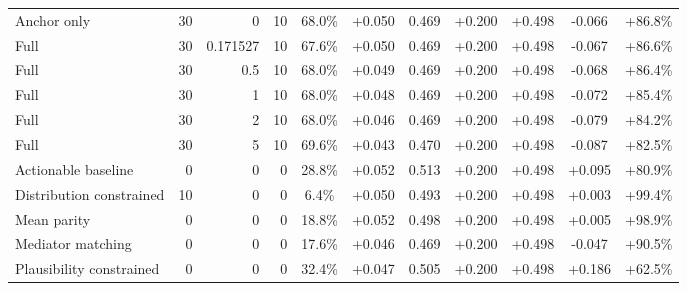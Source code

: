 \begin{table}[htbp]
\begin{tabular}{lrrrccccccc}
Anchor only & 30 & 0 & 10 & 68.0\% & +0.050 & 0.469 & +0.200 & +0.498 & -0.066 & +86.8\% \\
Full & 30 & 0.171527 & 10 & 67.6\% & +0.050 & 0.469 & +0.200 & +0.498 & -0.067 & +86.6\% \\
Full & 30 & 0.5 & 10 & 68.0\% & +0.049 & 0.469 & +0.200 & +0.498 & -0.068 & +86.4\% \\
Full & 30 & 1 & 10 & 68.0\% & +0.048 & 0.469 & +0.200 & +0.498 & -0.072 & +85.4\% \\
Full & 30 & 2 & 10 & 68.0\% & +0.046 & 0.469 & +0.200 & +0.498 & -0.079 & +84.2\% \\
Full & 30 & 5 & 10 & 69.6\% & +0.043 & 0.470 & +0.200 & +0.498 & -0.087 & +82.5\% \\
Actionable baseline & 0 & 0 & 0 & 28.8\% & +0.052 & 0.513 & +0.200 & +0.498 & +0.095 & +80.9\% \\
Distribution constrained & 10 & 0 & 0 & 6.4\% & +0.050 & 0.493 & +0.200 & +0.498 & +0.003 & +99.4\% \\
Mean parity & 0 & 0 & 0 & 18.8\% & +0.052 & 0.498 & +0.200 & +0.498 & +0.005 & +98.9\% \\
Mediator matching & 0 & 0 & 0 & 17.6\% & +0.046 & 0.469 & +0.200 & +0.498 & -0.047 & +90.5\% \\
Plausibility constrained & 0 & 0 & 0 & 32.4\% & +0.047 & 0.505 & +0.200 & +0.498 & +0.186 & +62.5\% \\
\bottomrule
\end{tabular}
\end{table}